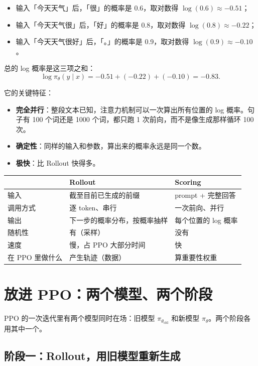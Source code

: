 \documentclass[UTF8,fontset=fandol]{ctexart}
\begin{document}
\begin{itemize}
  \item 输入「今天天气」后，「很」的概率是 0.6，取对数得 $\log(0.6) \approx -0.51$；
  \item 输入「今天天气很」后，「好」的概率是 0.8，取对数得 $\log(0.8) \approx -0.22$；
  \item 输入「今天天气很好」后，「。」的概率是 0.9，取对数得 $\log(0.9) \approx -0.10$。
\end{itemize}

总的 log 概率是这三项之和：
\[
\log \pi_\theta(y \mid x)
= -0.51 + (-0.22) + (-0.10) = -0.83 .
\]

它的关键特征：

\begin{itemize}
  \item \textbf{完全并行}：整段文本已知，注意力机制可以一次算出所有位置的 log 概率。句子有 100 个词还是 1000 个词，都只跑 1 次前向，而不是像生成那样循环 100 次。
  \item \textbf{确定性}：同样的输入和参数，算出来的概率永远是同一个数。
  \item \textbf{极快}：比 Rollout 快得多。
\end{itemize}

\begin{center}
\begin{tabular}{lll}
\hline
 & Rollout & Scoring \\
\hline
输入 & 截至目前已生成的前缀 & prompt + 完整回答 \\
调用方式 & 逐 token、串行 & 一次前向、并行 \\
输出 & 下一步的概率分布，按概率抽样 & 每个位置的 log 概率 \\
随机性 & 有（采样） & 没有 \\
速度 & 慢，占 PPO 大部分时间 & 快 \\
在 PPO 里做什么 & 产生轨迹（数据） & 算重要性权重 \\
\hline
\end{tabular}
\end{center}

\section{放进 PPO：两个模型、两个阶段}

PPO 的一次迭代里有两个模型同时在场：旧模型 $\pi_{\theta_{\text{old}}}$ 和新模型 $\pi_\theta$。两个阶段各用其中一个。

\subsection{阶段一：Rollout，用旧模型重新生成}
\end{document}
